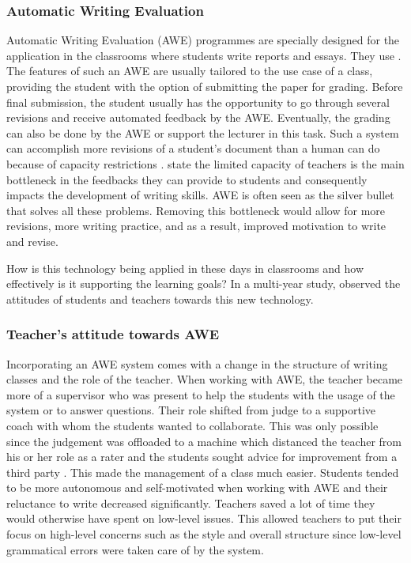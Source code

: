 \documentclass[runningheads]{llncs}
\begin{document}
\subsubsection{Automatic Writing Evaluation}
Automatic Writing Evaluation (AWE) \citep{grimes_utility_2010} programmes are specially designed for the application in the classrooms where students write reports and essays. They use  .
The features of such an AWE are usually tailored to the use case of a class, providing the student with the option of submitting the paper for grading. Before final submission, the student usually has the opportunity to go through several revisions and receive automated feedback by the AWE. Eventually, the grading can also be done by the AWE or support the lecturer in this task. Such a system can accomplish more revisions of a student's document than a human can do because of capacity restrictions \citep{warschauer_automated_2006}. \textcite{grimes_utility_2010} state the limited capacity of teachers is the main bottleneck in the feedbacks they can provide to students and consequently impacts the development of writing skills. AWE is often seen as the silver bullet that solves all these problems. Removing this bottleneck would allow for more revisions, more writing practice, and as a result, improved motivation to write and revise.        

How is this technology being applied in these days in classrooms and how effectively is it supporting the learning goals? In a multi-year study, \textcite{grimes_utility_2010} observed the attitudes of students and teachers towards this new technology. 

\subsubsection{Teacher's attitude towards AWE}
Incorporating an AWE system comes with a change in the structure of writing classes and the role of the teacher. When working with AWE, the teacher became more of a supervisor who was present to help the students with the usage of the system or to answer questions. Their role shifted from judge to a supportive coach with whom the students wanted to collaborate. This was only possible since the judgement was offloaded to a machine which distanced the teacher from his or her role as a rater and the students sought advice for improvement from a third party \citep{grimes_utility_2010}. This made the management of a class much easier. Students tended to be more autonomous and self-motivated when working with AWE and their reluctance to write decreased significantly. Teachers saved a lot of time they would otherwise have spent on low-level issues. This allowed teachers to put their focus on high-level concerns such as the style and overall structure since low-level grammatical errors were taken care of by the system.
\end{document}
